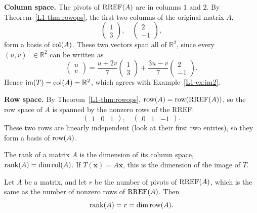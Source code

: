 \begin{example}
    \textbf{Column space.} The pivots of $\operatorname{RREF}(A)$ are in columns $1$ and $2$. By Theorem~\ref{L1-thm:rowops}, the first two columns of the original matrix $A$,
    \[\begin{pmatrix}
        1 \\
        3
    \end{pmatrix}, \quad
    \begin{pmatrix}
        2 \\
        -1
    \end{pmatrix},\]
    form a basis of $\operatorname{col}(A)$. These two vectors span all of $\mathbb{R}^2$, since every $(u, v)^\top \in \mathbb{R}^2$ can be written as
    \[\begin{pmatrix}
        u \\
        v
    \end{pmatrix} = \frac{u + 2v}{7} \begin{pmatrix}
        1 \\
        3
    \end{pmatrix} + \frac{3u - v}{7} \begin{pmatrix}
        2 \\
        -1
    \end{pmatrix}.\]
    Hence $\operatorname{im}(T) = \operatorname{col}(A) = \mathbb{R}^2$, which agrees with Example~\ref{L1-ex:im2}.

    \textbf{Row space.} By Theorem~\ref{L1-thm:rowops}, $\operatorname{row}(A) = \operatorname{row}(\operatorname{RREF}(A))$, so the row space of $A$ is spanned by the nonzero rows of the RREF:
    \[\begin{pmatrix}
        1 & 0 & 1
    \end{pmatrix}, \quad
    \begin{pmatrix}
        0 & 1 & -1
    \end{pmatrix}.\]
    These two rows are linearly independent (look at their first two entries), so they form a basis of $\operatorname{row}(A)$.
\end{example}

\begin{definition}[Rank]
    The rank of a matrix $A$ is the dimension of its column space, $\operatorname{rank}(A) = \dim \operatorname{col}(A)$. If $T(\mathbf{x}) = A\mathbf{x}$, this is the dimension of the image of $T$.
\end{definition}

\begin{theorem}\label{L1-thm:rank}
    Let $A$ be a matrix, and let $r$ be the number of pivots of $\operatorname{RREF}(A)$, which is the same as the number of nonzero rows of $\operatorname{RREF}(A)$. Then
    \[\operatorname{rank}(A) = r = \dim \operatorname{row}(A).\]
\end{theorem}

